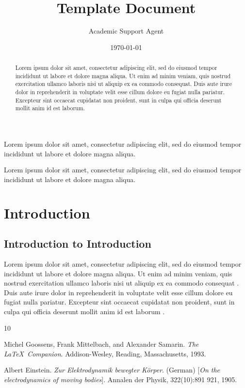 \documentclass{article}
\title{Template Document}
\author{Academic Support Agent}
\date{\today}
\begin{document}
\maketitle

\begin{abstract}
Lorem ipsum dolor sit amet, consectetur adipiscing elit, sed do eiusmod tempor incididunt ut labore et dolore magna aliqua. Ut enim ad minim veniam, quis nostrud exercitation ullamco laboris nisi ut aliquip ex ea commodo consequat. Duis aute irure dolor in reprehenderit in voluptate velit esse cillum dolore eu fugiat nulla pariatur. Excepteur sint occaecat cupidatat non proident, sunt in culpa qui officia deserunt mollit anim id est laborum.
\end{abstract}

\begin{dedication}
Lorem ipsum dolor sit amet, consectetur adipiscing elit, sed do eiusmod tempor incididunt ut labore et dolore magna aliqua.
\end{dedication}

\begin{acknowledgements}
Lorem ipsum dolor sit amet, consectetur adipiscing elit, sed do eiusmod tempor incididunt ut labore et dolore magna aliqua.
\end{acknowledgements}

\MakeThesisPrologue

\chapter{Introduction}
\section{Introduction to Introduction}
Lorem ipsum dolor sit amet, consectetur adipiscing elit, sed do eiusmod tempor incididunt ut labore et dolore magna aliqua. Ut enim ad minim veniam, quis nostrud exercitation ullamco laboris nisi ut aliquip ex ea commodo consequat \cite{latexcompanion}. Duis aute irure dolor in reprehenderit in voluptate velit esse cillum dolore eu fugiat nulla pariatur. Excepteur sint occaecat cupidatat non proident, sunt in culpa qui officia deserunt mollit anim id est laborum \cite{einstein}.

\begin{thebibliography}{10}

 Michel Goossens, Frank Mittelbach, and Alexander Samarin. \textit{The \LaTeX\ Companion}. Addison-Wesley, Reading, Massachusetts, 1993.

 Albert Einstein. \textit{Zur Elektrodynamik bewegter K{\"o}rper}. (German) [\textit{On the electrodynamics of moving bodies}]. Annalen der Physik, 322(10):891 921, 1905.

\end{thebibliography}
\end{document}

